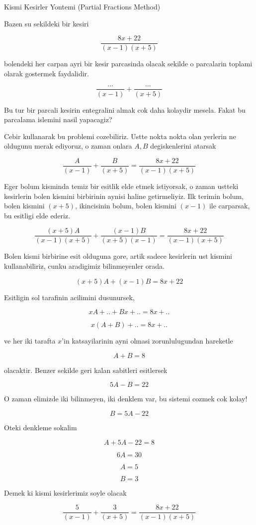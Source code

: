 \documentclass[12pt,fleqn]{article}\usepackage{../common}
\begin{document}
Kismi Kesirler Yontemi (Partial Fractions Method)

Bazen su sekildeki bir kesiri 

\[ \frac{8x + 22}{(x-1)(x+5)} \]

bolendeki her carpan ayri bir kesir parcasinda olacak sekilde o parcalarin
toplami olarak gostermek faydalidir. 

\[ \frac{...}{(x-1)} + \frac{...}{(x+5)} \]

Bu tur bir parcali kesirin entegralini almak cok daha kolaydir
mesela. Fakat bu parcalama islemini nasil yapacagiz?

Cebir kullanarak bu problemi cozebiliriz. Ustte nokta nokta olan yerlerin
ne oldugunu merak ediyoruz, o zaman onlara $A,B$ degiskenlerini atarsak

\[ \frac{A}{(x-1)} + \frac{B}{(x+5)} = \frac{8x + 22}{(x-1)(x+5)}\]

Eger bolum kisminda temiz bir esitlik elde etmek istiyorsak, o zaman
ustteki kesirlerin bolen kismini birbirinin aynisi haline getirmeliyiz. Ilk
terimin bolum, bolen kismini $(x+5)$, ikincisinin bolum, bolen kismini
$(x-1)$ ile carparsak, bu esitligi elde ederiz. 

\[ \frac{(x+5)A}{(x-1)(x+5)} + \frac{(x-1)B}{(x+5)(x-1)} = 
\frac{8x + 22}{(x-1)(x+5)}
\]


Bolen kismi birbirine esit olduguna gore, artik sadece kesirlerin ust
kismini kullanabiliriz, cunku aradigimiz bilinmeyenler orada. 

\[ (x+5)A + (x-1)B = 8x+22 \]

Esitligin sol tarafinin acilimini dusunursek, 

\[ xA + .. + Bx + .. = 8x + .. \]

\[ x(A + B) +  .. = 8x + .. \]


ve her iki tarafta $x$'in katsayilarinin ayni olmasi zorunlulugundan
hareketle

\[ A + B = 8 \]

olacaktir. Benzer sekilde geri kalan sabitleri esitlersek 

\[ 5A - B = 22 \]

O zaman elimizde iki bilinmeyen, iki denklem var, bu sistemi cozmek cok
kolay! 

\[ B = 5A - 22 \]

Oteki denkleme sokalim

\[ A + 5A - 22 = 8 \]

\[ 6A = 30 \]

\[ A = 5 \]

\[ B = 3 \]

Demek ki kismi kesirlerimiz soyle olacak 

\[ \frac{5}{(x-1)} + \frac{3}{(x+5)} = \frac{8x + 22}{(x-1)(x+5)}\]
\end{document}
